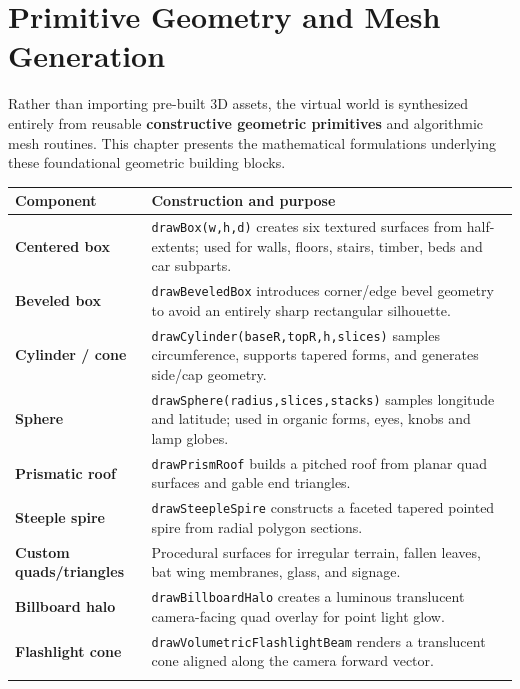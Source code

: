 \documentclass[10pt,a4paper,oneside]{article}
\begin{document}
\section{Primitive Geometry and Mesh Generation}
Rather than importing pre-built 3D assets, the virtual world is synthesized entirely from reusable \textbf{constructive geometric primitives} and algorithmic mesh routines. This chapter presents the mathematical formulations underlying these foundational geometric building blocks.

\begin{longtable}{p{}p{}}\toprule\textbf{Component} & \textbf{Construction and purpose}\\\midrule\endhead

\textbf{Centered box} & \texttt{drawBox(w,h,d)} creates six textured surfaces from half-extents; used for walls, floors, stairs, timber, beds and car subparts.\\\addlinespace[3pt]

\textbf{Beveled box} & \texttt{drawBeveledBox} introduces corner/edge bevel geometry to avoid an entirely sharp rectangular silhouette.\\\addlinespace[3pt]

\textbf{Cylinder / cone} & \texttt{drawCylinder(baseR,topR,h,slices)} samples circumference, supports tapered forms, and generates side/cap geometry.\\\addlinespace[3pt]

\textbf{Sphere} & \texttt{drawSphere(radius,slices,stacks)} samples longitude and latitude; used in organic forms, eyes, knobs and lamp globes.\\\addlinespace[3pt]

\textbf{Prismatic roof} & \texttt{drawPrismRoof} builds a pitched roof from planar quad surfaces and gable end triangles.\\\addlinespace[3pt]

\textbf{Steeple spire} & \texttt{drawSteepleSpire} constructs a faceted tapered pointed spire from radial polygon sections.\\\addlinespace[3pt]

\textbf{Custom quads/triangles} & Procedural surfaces for irregular terrain, fallen leaves, bat wing membranes, glass, and signage.\\\addlinespace[3pt]

\textbf{Billboard halo} & \texttt{drawBillboardHalo} creates a luminous translucent camera-facing quad overlay for point light glow.\\\addlinespace[3pt]

\textbf{Flashlight cone} & \texttt{drawVolumetricFlashlightBeam} renders a translucent cone aligned along the camera forward vector.\\\addlinespace[3pt]

\bottomrule\end{longtable}
\end{document}
